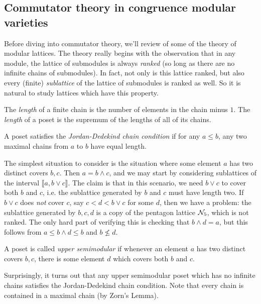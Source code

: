
\begin{appendices}

\chapter{Commutator theory in congruence modular varieties}\label{a-commutator}

Before diving into commutator theory, we'll review of some of the theory of modular lattices. The theory really begins with the observation that in any module, the lattice of submodules is always \emph{ranked} (so long as there are no infinite chains of submodules). In fact, not only is this lattice ranked, but also every (finite) \emph{sublattice} of the lattice of submodules is ranked as well. So it is natural to study lattices which have this property.

\begin{defn} The \emph{length} of a finite chain is the number of elements in the chain minus $1$. The \emph{length} of a poset is the supremum of the lengths of all of its chains.
\end{defn}

\begin{defn} A poset satisfies the \emph{Jordan-Dedekind chain condition} if for any $a \le b$, any two maximal chains from $a$ to $b$ have equal length.
\end{defn}

The simplest situation to consider is the situation where some element $a$ has two distinct covers $b,c$. Then $a = b \wedge c$, and we may start by considering sublattices of the interval $\llbracket a, b \vee c \rrbracket$. The claim is that in this scenario, we need $b\vee c$ to cover both $b$ and $c$, i.e. the sublattice generated by $b$ and $c$ must have length two. If $b \vee c$ does \emph{not} cover $c$, say $c < d < b \vee c$ for some $d$, then we have a problem: the sublattice generated by $b,c,d$ is a copy of the pentagon lattice $\mathcal{N}_5$, which is not ranked. The only hard part of verifying this is checking that $b \wedge d = a$, but this follows from $a \le b\wedge d \le b$ and $b \not\le d$.

\begin{defn} A poset is called \emph{upper semimodular} if whenever an element $a$ has two distinct covers $b,c$, there is some element $d$ which covers both $b$ and $c$.
\end{defn}

Surprisingly, it turns out that any upper semimodular poset which has no infinite chains satisfies the Jordan-Dedekind chain condition. Note that every chain is contained in a maximal chain (by Zorn's Lemma).%


\end{appendices}
